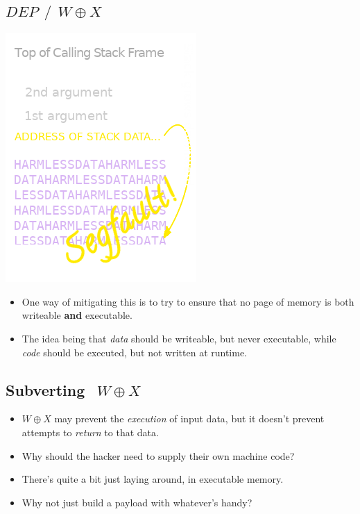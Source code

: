 \documentclass[11pt]{article}
\begin{document}
\subsection*{\(\textit{DEP}~~/~~W \oplus X\)}
\label{sec:org3d69e93}
\begin{center}
\includegraphics[width=.9\linewidth]{./img/stack_frame_attack_w^x.png}
\end{center}
\begin{itemize}
\item One way of mitigating this is to try to ensure that no page of memory is both writeable \textbf{and} executable.
\item The idea being that \emph{data} should be writeable, but never executable, while \emph{code} should be executed, but not written at runtime.
\end{itemize}


\subsection*{Subverting \(~~W\oplus X\)}
\label{sec:org7af5343}
\begin{itemize}
\item \(W\oplus X\) may prevent the \emph{execution} of input data, but it doesn't prevent attempts to \emph{return} to that data.
\item Why should the hacker need to supply their own machine code?
\item There's quite a bit just laying around, in executable memory.
\item Why not just build a payload with whatever's handy?
\end{itemize}
\end{document}
